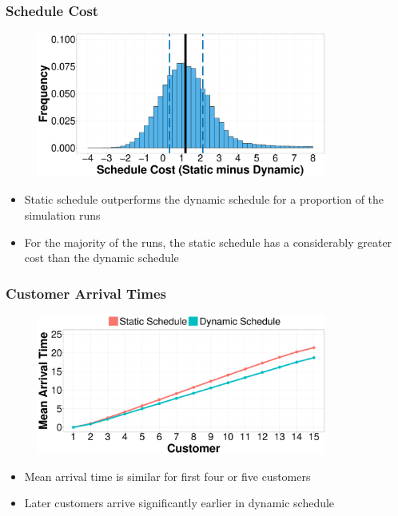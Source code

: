 \documentclass{beamer}
\begin{document}
\begin{frame}
	\frametitle{Schedule Cost}

	\begin{figure}
		\centering
		\includegraphics[width=0.85\textwidth]{Cost_Hist_Diff.eps}
	\end{figure}

	\begin{itemize}
		\item Static schedule outperforms the dynamic schedule for a proportion of the simulation runs
		\item For the majority of the runs, the static schedule has a considerably greater cost than the dynamic schedule
	\end{itemize}
\end{frame}

\begin{frame}
	\frametitle{Customer Arrival Times}

	\begin{figure}
		\centering
		\includegraphics[width=0.85\textwidth]{AT_Line.eps}
	\end{figure}

	\begin{itemize}
		\item Mean arrival time is similar for first four or five customers
		\item Later customers arrive significantly earlier in dynamic schedule
	\end{itemize}
\end{frame}
\end{document}

